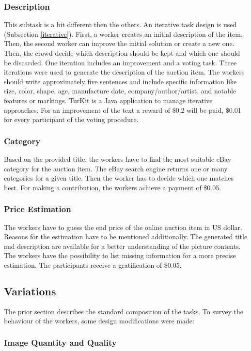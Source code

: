 \subsubsection{Description}
This subtask is a bit different then the others. An iterative task design is used (Subsection \ref{iterative}). First, a worker creates an initial description of the item. Then, the second worker can improve the initial solution or create a new one. Then, the crowd decide which description should be kept and which one should be discarded. One iteration includes an improvement and a voting task. Three iterations were used to generate the description of the auction item. The workers should write approximately five sentences and include specific information like size, color, shape, age, manufacture date, company/author/artist, and notable features or markings. TurKit is a Java application to manage iterative approaches. For an improvement of the text a reward of \$0.2 will be paid, \$0.01 for every participant of the voting procedure.
\subsubsection{Category}
Based on the provided title, the workers have to find the most suitable eBay category for the auction item. The eBay search engine returns one or many categories for a given title. Then the worker has to decide which one matches best. For making a contribution, the workers achieve a payment of \$0.05.
\subsubsection{Price Estimation}
The workers have to guess the end price of the online auction item in US dollar. Reasons for the estimation have to be mentioned additionally. The generated title and description are available for a better understanding of the picture contents. The workers have the possibility to list missing information for a more precise estimation. The participants receive a gratification of \$0.05.

\subsection{Variations}
The prior section describes the standard composition of the tasks. To survey the behaviour of the workers, some design modifications were made: 
\subsubsection{Image Quantity and Quality}

